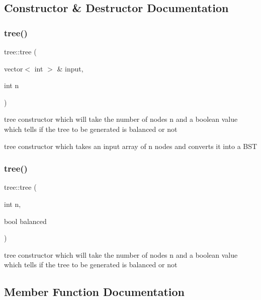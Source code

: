 \subsection{Constructor \& Destructor Documentation}
\mbox{\label{classtree_a943d10650f183701ae0414689c9b9ee8}} 
\subsubsection{\texorpdfstring{tree()}{tree()}\hspace{0.1cm}{\footnotesize\ttfamily [1/2]}}
{\footnotesize\ttfamily tree\+::tree (\begin{DoxyParamCaption}\item[{vector$<$ int $>$ \&}]{input,  }\item[{int}]{n }\end{DoxyParamCaption})}

tree constructor which will take the number of nodes n and a boolean value which tells if the tree to be generated is balanced or not

tree constructor which takes an input array of n nodes and converts it into a B\+ST \mbox{\label{classtree_a529a530e3787fdaee02ed65cbf1f17ff}} 
\subsubsection{\texorpdfstring{tree()}{tree()}\hspace{0.1cm}{\footnotesize\ttfamily [2/2]}}
{\footnotesize\ttfamily tree\+::tree (\begin{DoxyParamCaption}\item[{int}]{n,  }\item[{bool}]{balanced }\end{DoxyParamCaption})}

tree constructor which will take the number of nodes n and a boolean value which tells if the tree to be generated is balanced or not 

\subsection{Member Function Documentation}
\mbox{\label{classtree_a85b5b76a25645f657e21f706f386286f}} 
